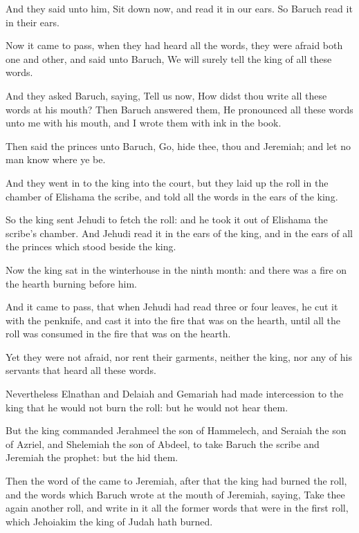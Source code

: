 \verse And they said unto him, Sit down now, and read it in our ears.  So Baruch read it in their ears.

\verse Now it came to pass, when they had heard all the words, they were afraid both one and other, and said unto Baruch, We will surely tell the king of all these words.

\verse And they asked Baruch, saying, Tell us now, How didst thou write all these words at his mouth?  \verse Then Baruch answered them, He pronounced all these words unto me with his mouth, and I wrote them with ink in the book.

\verse Then said the princes unto Baruch, Go, hide thee, thou and Jeremiah; and let no man know where ye be.

\verse And they went in to the king into the court, but they laid up the roll in the chamber of Elishama the scribe, and told all the words in the ears of the king.

\verse So the king sent Jehudi to fetch the roll: and he took it out of Elishama the scribe's chamber. And Jehudi read it in the ears of the king, and in the ears of all the princes which stood beside the king.

\verse Now the king sat in the winterhouse in the ninth month: and there was a fire on the hearth burning before him.

\verse And it came to pass, that when Jehudi had read three or four leaves, he cut it with the penknife, and cast it into the fire that was on the hearth, until all the roll was consumed in the fire that was on the hearth.

\verse Yet they were not afraid, nor rent their garments, neither the king, nor any of his servants that heard all these words.

\verse Nevertheless Elnathan and Delaiah and Gemariah had made intercession to the king that he would not burn the roll: but he would not hear them.

\verse But the king commanded Jerahmeel the son of Hammelech, and Seraiah the son of Azriel, and Shelemiah the son of Abdeel, to take Baruch the scribe and Jeremiah the prophet: but the \LORD hid them.

\verse Then the word of the \LORD came to Jeremiah, after that the king had burned the roll, and the words which Baruch wrote at the mouth of Jeremiah, saying, \verse Take thee again another roll, and write in it all the former words that were in the first roll, which Jehoiakim the king of Judah hath burned.

